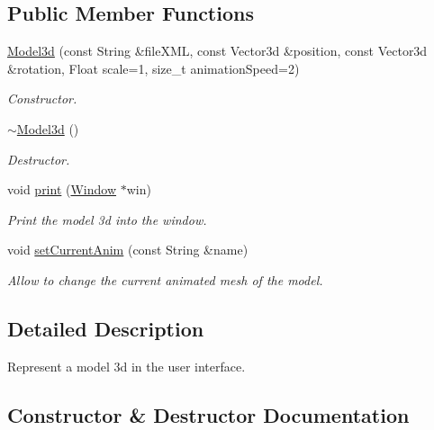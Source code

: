 \subsection*{Public Member Functions}
\begin{DoxyCompactItemize}
\item 
\hyperlink{classModel3d_a476f418b9ecfa99325611a44efa7f27c}{Model3d} (const String \&file\+X\+ML, const Vector3d \&position, const Vector3d \&rotation, Float scale=1, size\+\_\+t animation\+Speed=2)
\begin{DoxyCompactList}\small\item\em Constructor. \end{DoxyCompactList}\item 
\hyperlink{classModel3d_a7a4ec3be34c901538574d99d95a46b04}{$\sim$\+Model3d} ()
\begin{DoxyCompactList}\small\item\em Destructor. \end{DoxyCompactList}\item 
void \hyperlink{classModel3d_ae02d86ac82ec9f435cf1ebe668f3a6dd}{print} (\hyperlink{classWindow}{Window} $\ast$win)
\begin{DoxyCompactList}\small\item\em Print the model 3d into the window. \end{DoxyCompactList}\item 
void \hyperlink{classModel3d_a29eeaa6769b0c21268f4704ac2d404b7}{set\+Current\+Anim} (const String \&name)
\begin{DoxyCompactList}\small\item\em Allow to change the current animated mesh of the model. \end{DoxyCompactList}\end{DoxyCompactItemize}


\subsection{Detailed Description}
Represent a model 3d in the user interface. 

\subsection{Constructor \& Destructor Documentation}
\mbox{\label{classModel3d_a476f418b9ecfa99325611a44efa7f27c}} 
